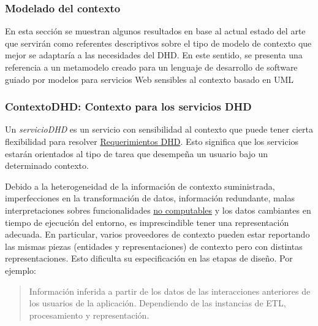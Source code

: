 

\subsubsection {Modelado del contexto} \label{sec:contextodhd}

En esta sección se muestran
algunos resultados en base al actual estado del arte que servirán como referentes
descriptivos sobre el tipo de modelo de contexto que mejor se adaptaría a las
necesidades del DHD. En este  sentido, se presenta una referencia a un metamodelo creado para un
lenguaje de desarrollo de software guiado por modelos para servicios Web
sensibles al contexto basado en UML\cite{ContextUML} 

\subsubsection{ContextoDHD: Contexto para los servicios DHD}\label{contextodhd}

Un \textit{servicioDHD}\label{serviciodhd} es un servicio con sensibilidad al
contexto que puede tener cierta flexibilidad para resolver 
\hyperref[RequerimientosDHD]{Requerimientos DHD}. Esto significa que los
servicios estarán orientados al tipo de tarea que desempeña un usuario bajo
un determinado contexto. 


Debido a la heterogeneidad de la información de contexto suministrada,
imperfecciones en la transformación de datos, información redundante, malas
interpretaciones sobres funcionalidades \hyperref[no_computable]{no
computables} y los datos cambiantes en tiempo de ejecución del entorno, es imprescindible tener una representación adecuada\cite{contextToolKit}. En particular, varios proveedores de contexto pueden estar reportando las mismas piezas (entidades y representaciones) de contexto
pero con distintas representaciones. Esto dificulta su especificación en las etapas de diseño. Por ejemplo: 

\begin{quote}
    Información inferida a partir de los datos de las interacciones anteriores de los usuarios de la aplicación. Dependiendo de las instancias de ETL, procesamiento y representación. 
\end{quote}

